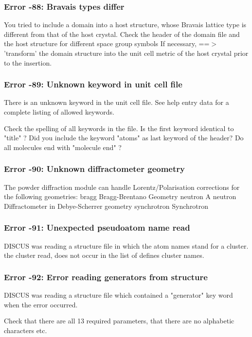 \subsubsection{Error -88: Bravais types differ}
\par
You tried to include a domain into a host structure, whose Bravais 
lattice type is different from that of the host crystal. 
Check the header of the domain file and the host structure for 
different space group symbols 
If necessary, ==$> $ 'transform' the domain structure into the unit cell 
metric of the host crystal prior to the insertion. 
\subsubsection{Error -89: Unknown keyword in unit cell file}
\par
There is an unknown keyword in the unit cell file. See help entry 
data for a complete listing of allowed keywords. 
\par
Check the spelling of all keywords in the file. 
Is the first keyword identical to "title" ? 
Did you include the keyword "atoms" as last keyword of the header? 
Do all molecules end with "molecule end" ? 
\subsubsection{Error -90: Unknown diffractometer geometry}
\par
The powder diffraction module can handle Lorentz/Polarisation 
corrections for the following geometries: 
bragg    Bragg-Brentano Geometry 
neutron  A neutron Diffractometer in Debye-Scherrer geometry 
synchrotron  Synchrotron 
\subsubsection{Error -91: Unexpected pseudoatom name read}
\par
DISCUS was reading a structure file in which the atom names stand for 
a cluster. the cluster read, does not occur in the list of defines 
cluster names. 
\subsubsection{Error -92: Error reading generators from structure}
\par
DISCUS was reading a structure file which contained a "generator" 
key word when the error occurred. 
\par
Check that there are all 13 required parameters, that there are no 
alphabetic characters etc. 
